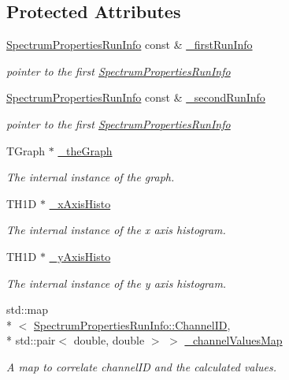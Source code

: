\subsection*{Protected Attributes}
\begin{DoxyCompactItemize}
\item 
\hyperlink{class_spectrum_properties_run_info}{Spectrum\-Properties\-Run\-Info} const \& \hyperlink{class_run_comparator_a3893b88661dc9ab2c46b8881d20772a2}{\-\_\-first\-Run\-Info}
\begin{DoxyCompactList}\small\item\em pointer to the first \hyperlink{class_spectrum_properties_run_info}{Spectrum\-Properties\-Run\-Info} \end{DoxyCompactList}\item 
\hyperlink{class_spectrum_properties_run_info}{Spectrum\-Properties\-Run\-Info} const \& \hyperlink{class_run_comparator_a2dc5760e0e8acc987f8a56a906895e5a}{\-\_\-second\-Run\-Info}
\begin{DoxyCompactList}\small\item\em pointer to the first \hyperlink{class_spectrum_properties_run_info}{Spectrum\-Properties\-Run\-Info} \end{DoxyCompactList}\item 
T\-Graph $\ast$ \hyperlink{class_run_comparator_ade24b6bfa3960ac66f027a2669014d6a}{\-\_\-the\-Graph}
\begin{DoxyCompactList}\small\item\em The internal instance of the graph. \end{DoxyCompactList}\item 
T\-H1\-D $\ast$ \hyperlink{class_run_comparator_ab86d48424540d0f3f9abf52a2c11366b}{\-\_\-x\-Axis\-Histo}
\begin{DoxyCompactList}\small\item\em The internal instance of the x axis histogram. \end{DoxyCompactList}\item 
T\-H1\-D $\ast$ \hyperlink{class_run_comparator_a05efdd671ec49502c946eb813e84ed62}{\-\_\-y\-Axis\-Histo}
\begin{DoxyCompactList}\small\item\em The internal instance of the y axis histogram. \end{DoxyCompactList}\item 
std\-::map\\*
$<$ \hyperlink{class_spectrum_properties_run_info_1_1_channel_i_d}{Spectrum\-Properties\-Run\-Info\-::\-Channel\-I\-D}, \\*
std\-::pair$<$ double, double $>$ $>$ \hyperlink{class_run_comparator_aae7b9f0694da7b251fdc513c5cf466b7}{\-\_\-channel\-Values\-Map}
\begin{DoxyCompactList}\small\item\em A map to correlate channel\-I\-D and the calculated values. \end{DoxyCompactList}\end{DoxyCompactItemize}


